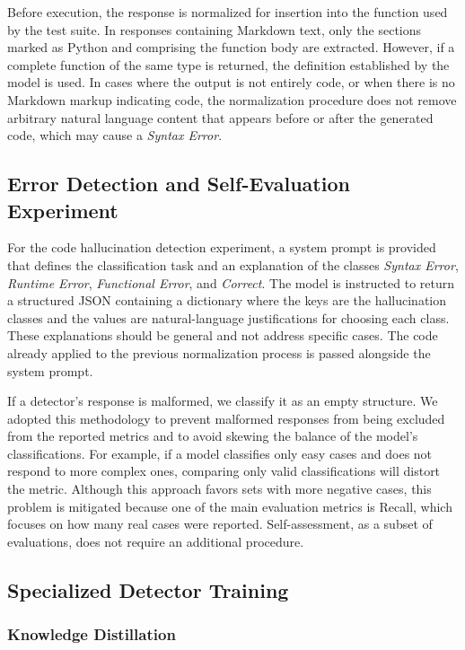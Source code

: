 Before execution, the response is normalized for insertion into the function used by the test suite. In responses containing Markdown text, only the sections marked as Python and comprising the function body are extracted. However, if a complete function of the same type is returned, the definition established by the model is used. In cases where the output is not entirely code, or when there is no Markdown markup indicating code, the normalization procedure does not remove arbitrary natural language content that appears before or after the generated code, which may cause a \emph{Syntax Error}.

\subsection{Error Detection and Self-Evaluation Experiment}

For the code hallucination detection experiment, a system prompt is provided that defines the classification task and an explanation of the classes \emph{Syntax Error}, \emph{Runtime Error}, \emph{Functional Error}, and \emph{Correct}. The model is instructed to return a structured JSON containing a dictionary where the keys are the hallucination classes and the values are natural-language justifications for choosing each class. These explanations should be general and not address specific cases. The code already applied to the previous normalization process is passed alongside the system prompt.

If a detector's response is malformed, we classify it as an empty structure. We adopted this methodology to prevent malformed responses from being excluded from the reported metrics and to avoid skewing the balance of the model's classifications. For example, if a model classifies only easy cases and does not respond to more complex ones, comparing only valid classifications will distort the metric. Although this approach favors sets with more negative cases, this problem is mitigated because one of the main evaluation metrics is Recall, which focuses on how many real cases were reported. Self-assessment, as a subset of evaluations, does not require an additional procedure.

\subsection{Specialized Detector Training}

\subsubsection{Knowledge Distillation}


